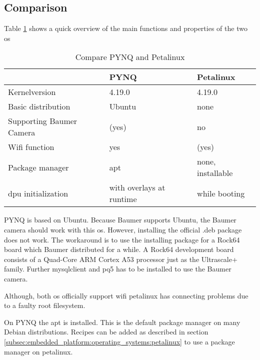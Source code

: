 \subsection{Comparison}
\label{subsec:embedded_platform:operating_systems:comparison}
Table \ref{tab:compare_os} shows a quick overview of the main functions and properties of the two \acrlong{os}

\begin{table}[hb]
  \caption{Compare PYNQ and Petalinux}
  \label{tab:compare_os}
  \centering
  \begin{tabular}{lll}
    \toprule
    \textbf{} & \textbf{PYNQ} & \textbf{Petalinux} \\
    \midrule
    Kernelversion & 4.19.0 & 4.19.0 \cite{petalinux_2019_1_release_notes} \\
    Basic distribution & Ubuntu \cite{pynq_presentation} & none \\
    Supporting Baumer Camera & (yes) \cite{baumer_prog_guide} & no \\
    Wifi function & yes & (yes) \\
    Package manager & \acrshort{apt} & none, installable \\
    dpu initialization & with overlays at runtime \cite{pynq_overlays} & while booting \\
    \bottomrule
  \end{tabular}
\end{table}

PYNQ is based on Ubuntu.
Because Baumer supports Ubuntu, the Baumer camera should work with this \acrlong{os}.
However, installing the official .deb package does not work.
The workaround is to use the installing package for a Rock64 board which Baumer distributed for a while.
A Rock64 development board consists of a Quad-Core ARM Cortex A53 processor just as the Ultrascale+ family.
Further mysqlclient and pq5 has to be installed to use the Baumer camera.

Although, both \acrshort{os} officially support wifi petalinux has connecting problems due to a faulty root filesystem.

On PYNQ the \acrfull{apt} is installed.
This is the default package manager on many Debian distributions.
Recipes can be added as described in section \ref{subsec:embedded_platform:operating_systems:petalinux} to use a package manager on petalinux.

